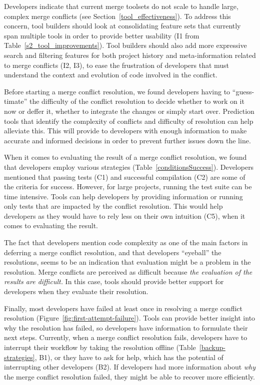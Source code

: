 Developers indicate that current merge toolsets do not scale to handle large, complex merge conflicts (see Section~\ref{tool_effectiveness}).
To address this concern, tool builders should look at consolidating feature sets that currently span multiple tools in order to provide better usability (I1 from Table~\ref{s2_tool_improvements}).
Tool builders should also add more expressive search and filtering features for both project history and meta-information related to merge conflicts (I2, I3), to ease the frustration of developers that must understand the context and evolution of code involved in the conflict.

Before starting a merge conflict resolution, we found developers having to ``guess-timate'' the difficulty of the conflict resolution to decide whether to work on it now or deffer it, whether to integrate the changes or simply start over. 
Prediction tools that identify the complexity of conflicts and difficulty of resolution can help alleviate this.
This will provide to developers with enough information to make accurate and informed decisions in order to prevent further issues down the line.

When it comes to evaluating the result of a merge conflict resolution, we found that developers employ various strategies (Table~\ref{conditionsSuccess}).
Developers mentioned that passing tests (C1) and successful compilation (C2) are some of the criteria for success.
However, for large projects, running the test suite can be time intensive.
Tools can help developers by providing information or running only tests that are impacted by the conflict resolution.
This would help developers as they would have to rely less on their own intuition (C5), when it comes to evaluating the result.

The fact that developers mention code complexity as one of the main factors in deferring a merge conflict resolution, and that developers ``eyeball'' the resolutions, seems to be an indication that evaluation might be a problem in the resolution.
Merge conflicts are perceived as difficult because \emph{the evaluation of the results are difficult.}
In this case, tools should provide better support for developers when they evaluate their resolution.

Finally, most developers have failed at least once in resolving a merge conflict resolution (Figure~\ref{fig:first-attempt-failure}).
Tools can provide better insight into why the resolution has failed, so developers have information to formulate their next steps.
Currently, when a merge conflict resolution fails, developers have to interrupt their workflow by taking the resolution offline (Table~\ref{backup-strategies}, B1), or they have to ask for help, which has the potential of interrupting other developers (B2).
If developers had more information about \emph{why} the merge conflict resolution failed, they might be able to recover more efficiently.

